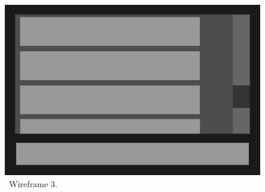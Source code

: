 \begin{figure}[h]
\begin{minipage}[b]{0.315\textwidth}
        \centering
        \includegraphics[width=\textwidth]{text/wireframe3.pdf}
        \caption{~Wireframe 3.}
        \label{fig:wireframe3}
    \end{minipage}
\end{figure}

